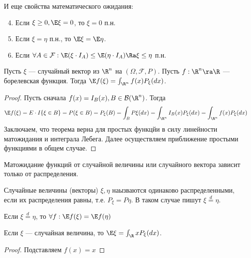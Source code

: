 И еще свойства математического ожидания:
\begin{enumerate}
    \setcounter{enumi}{3}
    \item Если \(\xi \ge 0, \E\xi = 0\), то \(\xi = 0\) п.н.
    \item Если \(\xi = \eta\) п.н., то \(\E\xi = \E\eta\).
    \item Если \(\forall A \in \mathcal{F}: \E(\xi \cdot I_A) \le \E(\eta \cdot I_A) \Ra \xi \le \eta\) п.н.
\end{enumerate}

\begin{theorem}
    Пусть \(\xi\) --- случайный вектор из \(\R^n\) на \((\Omega, \mathcal{F}, P)\). Пусть \(f: \R^n \ra \R\) --- борелевская функция. Тогда \(\E f(\xi) = \int_{\R^n} f(x) P_\xi(dx)\).
\end{theorem}
\begin{proof}
    Пусть сначала \(f(x) = I_B(x), B \in \mathcal{B}(\R^n)\). Тогда
    \[\E f(\xi) = E \cdot I\{\xi \in B\} = P(\xi \in B) = P_\xi(B) = \int_B P\xi(dx) = \int_{\R^n} I_B(x) P_\xi(dx) = \int_{\R^n} f(x) P_\xi(dx)\]
    Заключаем, что теорема верна для простых функцйи в силу линейности матожидания и интеграла Лебега. Далее осуществляем приближение простыми функциями в общем случае.
\end{proof}


\begin{note}
    Матожидание функций от случайной величины или случайного вектора зависит только от распределения.
\end{note}

\begin{definition}
    Случайные величины (векторы) \(\xi, \eta\) наызваются одинаково распределенными, если их распределения равны, т.е. \(P_\xi = P\eta\). В таком случае пишут \(\xi \stackrel{d}{=} \eta\).
\end{definition}

\begin{corollary}
    Если \(\xi \stackrel{d}{=} \eta\), то \(\forall f: \E f(\xi) = \E f(\eta)\)
\end{corollary}

\begin{corollary}
    Если \(\xi\) --- случайная величина, то \(\E \xi = \int_{\R} x P_\xi(dx)\).
\end{corollary}
\begin{proof}
    Подставляем \(f(x) = x\)
\end{proof}

